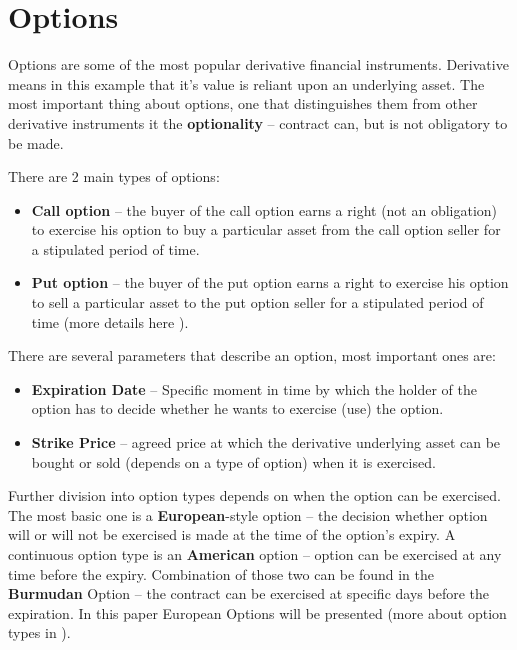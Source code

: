 \section{Options}
    Options are some of the most popular derivative financial instruments. Derivative means in this example that it's value is reliant upon an underlying asset. The most important thing about options, one that distinguishes them from other derivative instruments it the \textbf{optionality} -- contract can, but is not obligatory to be made.
    
    There are 2 main types of options:
    \begin{itemize}
        \item \textbf{Call option} -- the buyer of the call option earns a right (not an obligation) to exercise his option to buy a particular asset from the call option seller for a stipulated period of time.
        \item \textbf{Put option} -- the buyer of the put option earns a right to exercise his option to sell a particular asset to the put option seller for a stipulated period of time (more details here \cite{Call_Put_Option_Definition}).
    \end{itemize}
    
    There are several parameters that describe an option, most important ones are:
    \begin{itemize}
        \item \textbf{Expiration Date} -- Specific moment in time by which the holder of the option has to decide whether he wants to exercise (use) the option.
        \item \textbf{Strike Price} -- agreed price at which the derivative underlying asset can be bought or sold (depends on a type of option) when it is exercised.
    \end{itemize}
    \noindent
    Further division into option types depends on when the option can be exercised. The most basic one is a \textbf{European}-style option -- the decision whether option will or will not be exercised is made at the time of the option's expiry. A continuous option type is an \textbf{American} option -- option can be exercised at any time before the expiry. Combination of those two can be found in the \textbf{Burmudan} Option -- the contract can be exercised at specific days before the expiration. In this paper European Options will be presented (more about option types in \cite{Option_Types}).
    
